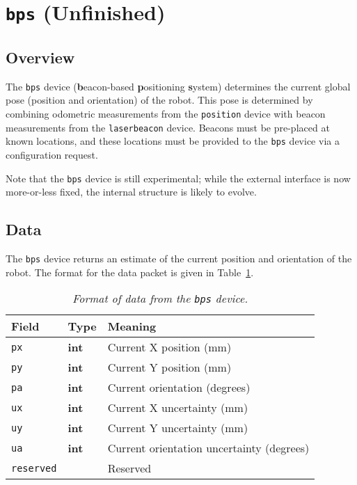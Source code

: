 \section{{\tt bps} {\bf (Unfinished)}}

\subsection*{Overview}

The {\tt bps} device ({\bf b}eacon-based {\bf p}ositioning {\bf
s}ystem) determines the current global pose (position and
orientation) of the robot.  This pose is determined by combining
odometric measurements from the {\tt position} device with beacon
measurements from the {\tt laserbeacon} device.  Beacons must be
pre-placed at known locations, and these locations must be provided to
the {\tt bps} device via a configuration request.

Note that the {\tt bps} device is still experimental; while the external
interface is now more-or-less fixed, the internal structure is likely
to evolve.

\subsection*{Data}

The {\tt bps} device returns an estimate of the current position and
orientation of the robot.  The format for the data packet is given in
Table~\ref{table:bps_data}.

\begin{table}[ht]
\begin{center}
\begin{tabularx}{\columnwidth}{|l|l|X|}
\hline
Field & Type & Meaning\\
\hline
{\tt px} & {\bf int} & Current X position (mm)\\
{\tt py} & {\bf int} & Current Y position (mm)\\
{\tt pa} & {\bf int} & Current orientation (degrees)\\
{\tt ux} & {\bf int} & Current X uncertainty (mm)\\
{\tt uy} & {\bf int} & Current Y uncertainty (mm)\\
{\tt ua} & {\bf int} & Current orientation uncertainty (degrees)\\
{\tt reserved} & & Reserved\\
\hline
\end{tabularx}
\end{center}
\caption{{\em Format of data from the {\tt bps} device.}}
\label{table:bps_data}
\end{table}


